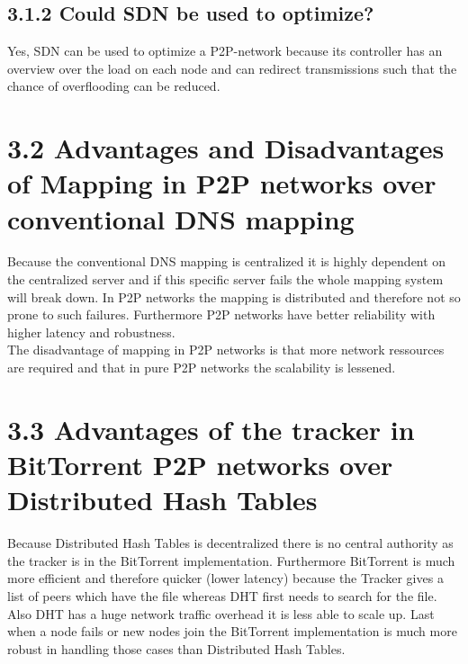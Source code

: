 \documentclass{article}
\begin{document}
\begin{adjustwidth}{2em}{2em}
		\subsection*{3.1.2 Could SDN be used to optimize?}
		\begin{adjustwidth}{2em}{2em}
			Yes, SDN can be used to optimize a P2P-network because its controller has an overview over the load on each node and can redirect transmissions such that the chance of overflooding can be reduced.
		\end{adjustwidth}
	\end{adjustwidth}
	
	\section*{3.2 Advantages and Disadvantages of Mapping in P2P networks over conventional DNS mapping}
	\begin{adjustwidth}{2em}{2em}
		Because the conventional DNS mapping is centralized it is highly dependent on the centralized server and if this specific server fails the whole mapping system will break down. In P2P networks the mapping is distributed and therefore not so prone to such failures. Furthermore P2P networks have better reliability with higher latency and robustness. \\
		The disadvantage of mapping in P2P networks is that more network ressources are required and that in pure P2P networks the scalability is lessened.
	\end{adjustwidth}
	
	\section*{3.3 Advantages of the tracker in BitTorrent P2P networks over Distributed Hash Tables}
	\begin{adjustwidth}{2em}{2em}
		Because Distributed Hash Tables is decentralized there is no central authority as the tracker is in the BitTorrent implementation. Furthermore BitTorrent is much more efficient and therefore quicker (lower latency) because the Tracker gives a list of peers which have the file whereas DHT first needs to search for the file. Also DHT has a huge network traffic overhead it is less able to scale up. Last when a node fails or new nodes join the BitTorrent implementation is much more robust in handling those cases than Distributed Hash Tables.
	\end{adjustwidth}
	
\end{document}
